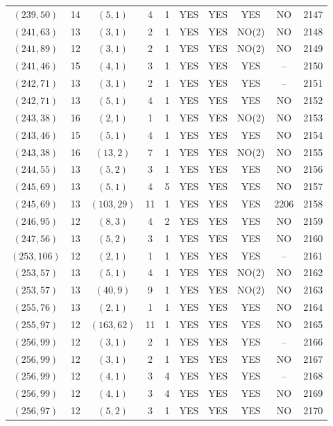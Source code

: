 \begin{longtable}{|c|c|c|c|c|c|c|c|c|c|}
$(239, 50)$ & 14 & $(5, 1)$ & 4 & 1 & YES & YES & YES & NO & 2147\\
$(241, 63)$ & 13 & $(3, 1)$ & 2 & 1 & YES & YES & NO(2) & NO & 2148\\
$(241, 89)$ & 12 & $(3, 1)$ & 2 & 1 & YES & YES & NO(2) & NO & 2149\\
$(241, 46)$ & 15 & $(4, 1)$ & 3 & 1 & YES & YES & YES & -- & 2150\\
$(242, 71)$ & 13 & $(3, 1)$ & 2 & 1 & YES & YES & YES & -- & 2151\\
$(242, 71)$ & 13 & $(5, 1)$ & 4 & 1 & YES & YES & YES & NO & 2152\\
$(243, 38)$ & 16 & $(2, 1)$ & 1 & 1 & YES & YES & NO(2) & NO & 2153\\
$(243, 46)$ & 15 & $(5, 1)$ & 4 & 1 & YES & YES & YES & NO & 2154\\
$(243, 38)$ & 16 & $(13, 2)$ & 7 & 1 & YES & YES & NO(2) & NO & 2155\\
$(244, 55)$ & 13 & $(5, 2)$ & 3 & 1 & YES & YES & YES & NO & 2156\\
$(245, 69)$ & 13 & $(5, 1)$ & 4 & 5 & YES & YES & YES & NO & 2157\\
$(245, 69)$ & 13 & $(103, 29)$ & 11 & 1 & YES & YES & YES & 2206 & 2158\\
$(246, 95)$ & 12 & $(8, 3)$ & 4 & 2 & YES & YES & YES & NO & 2159\\
$(247, 56)$ & 13 & $(5, 2)$ & 3 & 1 & YES & YES & YES & NO & 2160\\
$(253, 106)$ & 12 & $(2, 1)$ & 1 & 1 & YES & YES & YES & -- & 2161\\
$(253, 57)$ & 13 & $(5, 1)$ & 4 & 1 & YES & YES & NO(2) & NO & 2162\\
$(253, 57)$ & 13 & $(40, 9)$ & 9 & 1 & YES & YES & NO(2) & NO & 2163\\
$(255, 76)$ & 13 & $(2, 1)$ & 1 & 1 & YES & YES & YES & NO & 2164\\
$(255, 97)$ & 12 & $(163, 62)$ & 11 & 1 & YES & YES & YES & NO & 2165\\
$(256, 99)$ & 12 & $(3, 1)$ & 2 & 1 & YES & YES & YES & -- & 2166\\
$(256, 99)$ & 12 & $(3, 1)$ & 2 & 1 & YES & YES & YES & NO & 2167\\
$(256, 99)$ & 12 & $(4, 1)$ & 3 & 4 & YES & YES & YES & -- & 2168\\
$(256, 99)$ & 12 & $(4, 1)$ & 3 & 4 & YES & YES & YES & NO & 2169\\
$(256, 97)$ & 12 & $(5, 2)$ & 3 & 1 & YES & YES & YES & NO & 2170\\

\end{longtable}
